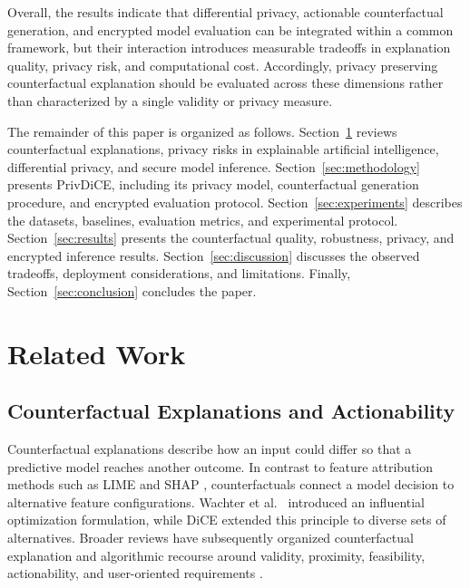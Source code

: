 \documentclass[preprint,12pt]{elsarticle}
\begin{document}
Overall, the results indicate that differential privacy, actionable
counterfactual generation, and encrypted model evaluation can be integrated
within a common framework, but their interaction introduces measurable
tradeoffs in explanation quality, privacy risk, and computational cost. Accordingly, privacy preserving counterfactual explanation should be evaluated across these dimensions rather than characterized by a single validity or privacy measure.

The remainder of this paper is organized as follows.
Section~\ref{sec:related_work} reviews counterfactual explanations, privacy
risks in explainable artificial intelligence, differential privacy, and secure model inference. Section~\ref{sec:methodology} presents PrivDiCE, including its privacy model, counterfactual generation procedure, and encrypted evaluation protocol. Section~\ref{sec:experiments} describes the datasets, baselines, evaluation metrics, and experimental protocol. Section~\ref{sec:results} presents the counterfactual quality, robustness, privacy, and encrypted inference results. Section~\ref{sec:discussion} discusses the observed tradeoffs, deployment considerations, and limitations. Finally,
Section~\ref{sec:conclusion} concludes the paper.

\section{Related Work}
\label{sec:related_work}

\subsection{Counterfactual Explanations and Actionability}
\label{subsec:counterfactuals}

Counterfactual explanations describe how an input could differ so that a
predictive model reaches another outcome. In contrast to feature attribution
methods such as LIME and SHAP \cite{ribeiro2016why,lundberg2017unified},
counterfactuals connect a model decision to alternative feature configurations.
Wachter et al.~\cite{wachter2017counterfactual} introduced an influential
optimization formulation, while DiCE \cite{mothilal2020dice} extended this
principle to diverse sets of alternatives. Broader reviews have subsequently
organized counterfactual explanation and algorithmic recourse around validity,
proximity, feasibility, actionability, and user-oriented requirements
\cite{karimi2022survey}.
\end{document}
